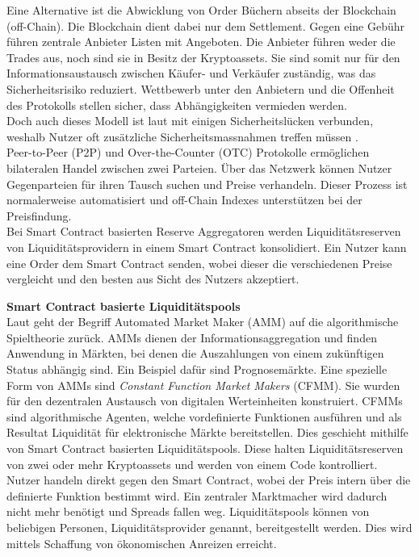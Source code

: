 \documentclass[12pt,a4paper,titlepage,oneside,english]{article}
\begin{document}
Eine Alternative ist die Abwicklung von Order Büchern abseits der Blockchain (off-Chain). Die Blockchain dient dabei nur dem Settlement. Gegen eine Gebühr führen zentrale Anbieter Listen mit Angeboten. Die Anbieter führen weder die Trades aus, noch sind sie in Besitz der Kryptoassets. Sie sind somit nur für den Informationsaustausch zwischen Käufer- und Verkäufer zuständig, was das Sicherheitsrisiko reduziert.  Wettbewerb unter den Anbietern und die Offenheit des Protokolls stellen sicher, dass Abhängigkeiten vermieden werden. \citep[vgl.][S.8]{Schaer2020} \\ Doch auch dieses Modell ist laut \cite{Angeris2019} mit einigen Sicherheitslücken verbunden, weshalb Nutzer oft zusätzliche Sicherheitsmassnahmen treffen müssen \citep[S.2]{Angeris2019}.\\
Peer-to-Peer (P2P) und Over-the-Counter (OTC) Protokolle ermöglichen bilateralen Handel zwischen zwei Parteien. Über das Netzwerk können Nutzer Gegenparteien für ihren Tausch suchen und Preise verhandeln. Dieser Prozess ist normalerweise automatisiert und off-Chain Indexes unterstützen bei der Preisfindung. \citep[vgl.][S.11]{Schaer2020} \\
Bei Smart Contract basierten Reserve Aggregatoren werden Liquiditätsreserven von Liquiditätsprovidern in einem Smart Contract konsolidiert. Ein Nutzer kann eine Order dem Smart Contract senden, wobei dieser die verschiedenen Preise vergleicht und den besten aus Sicht des Nutzers akzeptiert. \citep[vgl.][S.10f.]{Schaer2020} %

\textbf{Smart Contract basierte Liquiditätspools}\\
Laut \cite{Berenzon2020} geht der Begriff Automated Market Maker (AMM) auf die algorithmische Spieltheorie zurück. AMMs dienen der Informationsaggregation und finden Anwendung in Märkten, bei denen die Auszahlungen von einem zukünftigen Status abhängig sind. Ein Beispiel dafür sind Prognosemärkte.
Eine spezielle Form von AMMs sind \textit{Constant Function Market Makers} (CFMM). Sie wurden für den dezentralen Austausch von digitalen Werteinheiten konstruiert. CFMMs sind algorithmische Agenten, welche vordefinierte Funktionen ausführen und als Resultat Liquidität für elektronische Märkte bereitstellen. Dies geschieht mithilfe von Smart Contract basierten Liquiditätspools. Diese halten Liquiditätsreserven von zwei oder mehr Kryptoassets und werden von einem Code kontrolliert. Nutzer handeln direkt gegen den Smart Contract, wobei der Preis intern über die definierte Funktion bestimmt wird. Ein zentraler Marktmacher wird dadurch nicht mehr benötigt und Spreads fallen weg. 
Liquiditätspools können von beliebigen Personen, Liquiditätsprovider genannt, bereitgestellt werden. Dies wird mittels Schaffung von ökonomischen Anreizen erreicht. \citep{Berenzon2020}
\end{document}

